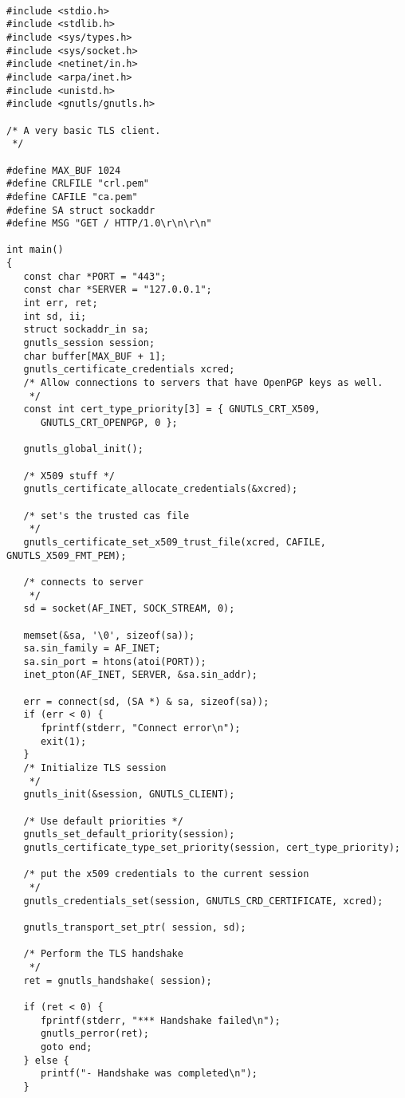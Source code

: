 \begin{verbatim}

#include <stdio.h>
#include <stdlib.h>
#include <sys/types.h>
#include <sys/socket.h>
#include <netinet/in.h>
#include <arpa/inet.h>
#include <unistd.h>
#include <gnutls/gnutls.h>

/* A very basic TLS client.
 */

#define MAX_BUF 1024
#define CRLFILE "crl.pem"
#define CAFILE "ca.pem"
#define SA struct sockaddr
#define MSG "GET / HTTP/1.0\r\n\r\n"

int main()
{
   const char *PORT = "443";
   const char *SERVER = "127.0.0.1";
   int err, ret;
   int sd, ii;
   struct sockaddr_in sa;
   gnutls_session session;
   char buffer[MAX_BUF + 1];
   gnutls_certificate_credentials xcred;
   /* Allow connections to servers that have OpenPGP keys as well.
    */
   const int cert_type_priority[3] = { GNUTLS_CRT_X509, 
      GNUTLS_CRT_OPENPGP, 0 };

   gnutls_global_init();

   /* X509 stuff */
   gnutls_certificate_allocate_credentials(&xcred);

   /* set's the trusted cas file
    */
   gnutls_certificate_set_x509_trust_file(xcred, CAFILE, GNUTLS_X509_FMT_PEM);

   /* connects to server 
    */
   sd = socket(AF_INET, SOCK_STREAM, 0);

   memset(&sa, '\0', sizeof(sa));
   sa.sin_family = AF_INET;
   sa.sin_port = htons(atoi(PORT));
   inet_pton(AF_INET, SERVER, &sa.sin_addr);

   err = connect(sd, (SA *) & sa, sizeof(sa));
   if (err < 0) {
      fprintf(stderr, "Connect error\n");
      exit(1);
   }
   /* Initialize TLS session 
    */
   gnutls_init(&session, GNUTLS_CLIENT);

   /* Use default priorities */
   gnutls_set_default_priority(session);
   gnutls_certificate_type_set_priority(session, cert_type_priority);

   /* put the x509 credentials to the current session
    */
   gnutls_credentials_set(session, GNUTLS_CRD_CERTIFICATE, xcred);

   gnutls_transport_set_ptr( session, sd);

   /* Perform the TLS handshake
    */
   ret = gnutls_handshake( session);

   if (ret < 0) {
      fprintf(stderr, "*** Handshake failed\n");
      gnutls_perror(ret);
      goto end;
   } else {
      printf("- Handshake was completed\n");
   }


\end{verbatim}

